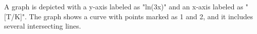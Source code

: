 A graph is depicted with a y-axis labeled as "ln(3x)" and an x-axis labeled as "[T/K]". The graph shows a curve with points marked as 1 and 2, and it includes several intersecting lines.